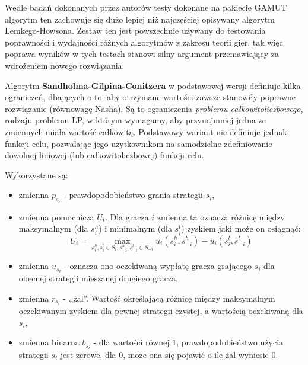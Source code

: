 \documentclass[polish]{standalone}
\begin{document}
Wedle badań dokonanych przez autorów testy dokonane na pakiecie GAMUT algorytm ten zachowuje się dużo lepiej niż
najczęściej opisywany algorytm Lemkego-Howsona. Zestaw ten jest powszechnie używany do testowania poprawności
i wydajności różnych algorytmów z zakresu teorii gier, tak więc poprawa wyników w tych testach stanowi silny argument
przemawiający za wdrożeniem nowego rozwiązania.\cite{GAMUT}

Algorytm \textbf{Sandholma-Gilpina-Conitzera}\cite{SCG-NE} w podstawowej wersji definiuje kilka ograniczeń, dbających o
to, aby otrzymane wartości zawsze stanowiły poprawne rozwiązanie (równowagę Nasha). Są to ograniczenia \textit{problemu
całkowitoliczbowego}, rodzaju problemu LP, w którym wymagamy, aby przynajmniej jedna ze
zmiennych miała wartość całkowitą. Podstawowy wariant nie definiuje jednak funkcji celu, pozwalając jego użytkownikom
na samodzielne zdefiniowanie dowolnej liniowej (lub całkowitoliczbowej) funkcji celu.

Wykorzystane są: 
\begin{itemize}
\item zmienna $p_{s_i}$ - prawdopodobieństwo grania strategii $s_i$,
\item zmienna pomocnicza $U_i$. Dla gracza $i$ zmienna ta oznacza różnicę między maksymalnym (dla $s_i^h$) i minimalnym
(dla $s_i^l$) zyskiem jaki może on osiągnąć:
$$U_i = \max_{s_i^h, s_i^l \in S_i, s_{-i}^h, s_{-i}^l \in S_{-i}} u_i(s_i^h, s_{-i}^h) - u_i(s_i^l, s_{-i}^l)$$
\item zmienna $u_{s_i}$ - oznacza ono oczekiwaną wypłatę gracza grającego $s_i$ dla obecnej strategii mieszanej drugiego
gracza,
\item zmienną $r_{s_i}$ - ,,żal''. Wartość określającą różnicę między maksymalnym oczekiwanym zyskiem dla
pewnej strategii czystej, a wartością oczekiwaną dla $s_i$,
\item zmienna binarna $b_{s_i}$ - dla wartości równej $1$, prawdopodobieństwo użycia strategii $s_i$ jest zerowe,
dla $0$, może ona się pojawić o ile żal wyniesie $0$.
\end{itemize}
\end{document}
